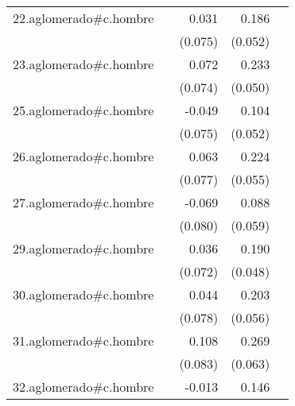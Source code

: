 {\begin{longtable}{l*{4}{D{.}{.}{-1}}}
\addlinespace
22.aglomerado#c.hombre&                     &       0.031         &       0.186\sym{***}&                     \\
            &                     &     (0.075)         &     (0.052)         &                     \\
\addlinespace
23.aglomerado#c.hombre&                     &       0.072         &       0.233\sym{***}&                     \\
            &                     &     (0.074)         &     (0.050)         &                     \\
\addlinespace
25.aglomerado#c.hombre&                     &      -0.049         &       0.104\sym{*}  &                     \\
            &                     &     (0.075)         &     (0.052)         &                     \\
\addlinespace
26.aglomerado#c.hombre&                     &       0.063         &       0.224\sym{***}&                     \\
            &                     &     (0.077)         &     (0.055)         &                     \\
\addlinespace
27.aglomerado#c.hombre&                     &      -0.069         &       0.088         &                     \\
            &                     &     (0.080)         &     (0.059)         &                     \\
\addlinespace
29.aglomerado#c.hombre&                     &       0.036         &       0.190\sym{***}&                     \\
            &                     &     (0.072)         &     (0.048)         &                     \\
\addlinespace
30.aglomerado#c.hombre&                     &       0.044         &       0.203\sym{***}&                     \\
            &                     &     (0.078)         &     (0.056)         &                     \\
\addlinespace
31.aglomerado#c.hombre&                     &       0.108         &       0.269\sym{***}&                     \\
            &                     &     (0.083)         &     (0.063)         &                     \\
\addlinespace
32.aglomerado#c.hombre&                     &      -0.013         &       0.146\sym{**} &                     \\

\end{longtable}}
